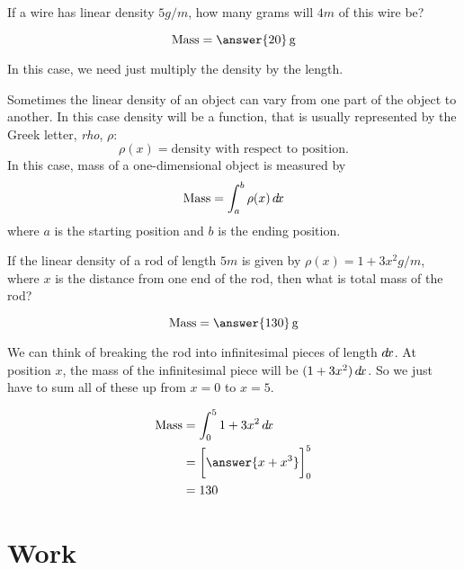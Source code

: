 \documentclass{ximera}
\begin{document}
\begin{question}
  If a wire has linear density $5 \unit{g}/\unit{m}$, how many grams
  will $4 \unit{m}$ of this wire be?
  \begin{prompt}
  \[
  \text{Mass} = \answer{20} \unit{g}
  \]
  \end{prompt}
  \begin{hint}
    In this case, we need just multiply the density by the length.
  \end{hint}
\end{question}

Sometimes the linear density of an object can vary from one part of
the object to another. In this case density will be a function, that
is usually represented by the Greek letter, \textit{rho}, $\rho$:
\[
\rho(x) = \text{density with respect to position.}
\]
In this case, mass of a one-dimensional object is measured by
\[
\text{Mass} = \int_{a}^{b} \rho(x) \mathop{}\!d\! x
\]
where $a$ is the starting position and $b$ is the ending position.

\begin{question}
  If the linear density of a rod of length $5\unit{m}$ is given by
  $\rho(x) = 1+3x^2 \unit{g}/\unit{m}$, where $x$ is the distance from
  one end of the rod, then what is total mass of the rod?
  \begin{prompt}
    \[
    \text{Mass} = \answer{130} \unit{g}
    \]
  \end{prompt}
  \begin{hint}
    We can think of breaking the rod into infinitesimal pieces of
    length $\mathop{}\!d\! x$.  At position $x$, the mass of the infinitesimal
    piece will be $(1+3x^2)\mathop{}\!d\! x$.  So we just have to sum all of these
    up from $x=0$ to $x=5$.
  \end{hint}
  \begin{hint}
    \begin{align*}
      \text{Mass} &= \int_0^5 1+3x^2 \d x\\
      &=\eval{\answer{x+x^3}}_0^5\\
      &=130
    \end{align*}
  \end{hint}
\end{question}

\section{Work}
\end{document}
